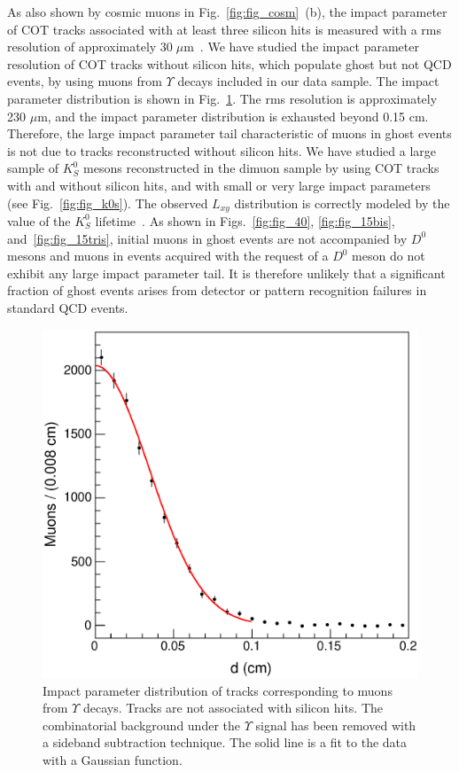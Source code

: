 \documentclass[aps,prd,preprint,floatfix,nofootinbib,superscriptaddress,showpacs,amssymb]{revtex4}
\begin{document}
 As also shown by cosmic muons in Fig.~\ref{fig:fig_cosm}~(b), the impact
 parameter of COT tracks associated with at least three silicon hits
 is measured with a rms resolution of approximately $30\;\mu$m~\cite{bbxs}.
 We have studied the impact parameter resolution of COT tracks without
 silicon hits, which populate ghost but not QCD events, by using muons
 from $\Upsilon$ decays included in our data sample. The impact parameter
 distribution is shown in Fig.~\ref{fig:fig_yd0}. The rms resolution is
 approximately 230 $\mu$m, and the impact parameter distribution is
 exhausted beyond 0.15 cm. Therefore, the large impact parameter tail
 characteristic of muons in ghost events is not due to tracks reconstructed
 without silicon hits. We have studied a large sample of $K^0_S$ mesons 
 reconstructed in the dimuon sample by using COT tracks with and without
 silicon hits, and with small or very large impact parameters (see
 Fig.~\ref{fig:fig_k0s}). The observed $L_{xy}$ distribution is correctly
 modeled by the value of the $K^0_S$ lifetime~\cite{pdg}. As shown in 
 Figs.~\ref{fig:fig_40}, \ref{fig:fig_15bis}, and~\ref{fig:fig_15tris},
 initial muons in ghost events are not accompanied by $D^0$ mesons and
 muons in events acquired with the request of a $D^0$ meson do not exhibit
 any large impact parameter tail. It is therefore unlikely that a significant
 fraction of ghost events arises from detector or pattern recognition
 failures in standard QCD events.
 \begin{figure}
 \begin{center}
 \vspace{-0.3in}
 \leavevmode
 \includegraphics*[width=\textwidth]{fa0_upsid0.eps}
 \caption[]{Impact parameter distribution of tracks corresponding to muons
            from $\Upsilon$ decays. Tracks are not associated with silicon
            hits. The combinatorial background under the $\Upsilon$ signal
            has been removed with a sideband subtraction technique. The 
            solid line is a  fit to the data with a Gaussian function.} 
 \label{fig:fig_yd0}
 \end{center}
 \end{figure}
\end{document}
